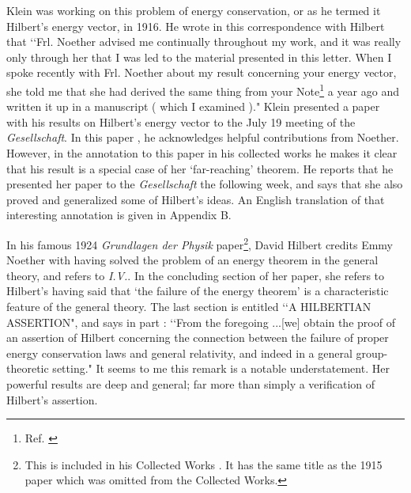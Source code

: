  Klein was working on this problem of energy conservation, or as he
termed it Hilbert's energy vector, in 1916.   He wrote in this correspondence 
with Hilbert that
\lq\lq Frl.  Noether advised me continually throughout my work, and it was really only
through her that I was led to the material presented in this letter.  When I spoke recently
with Frl.  Noether about my result concerning your energy vector, she told me that she had
derived the same thing from your Note\footnote{ Ref.  \cite{hilbert}} a year ago and written
it up in a manuscript ( which I examined )."  Klein presented a paper 
with his results 
 on Hilbert's energy
vector to the July 19 meeting of the {\it{Gesellschaft}}.   In this paper
\cite{kleinpap}, he
acknowledges helpful contributions from Noether. However, in the annotation
to this paper in his
collected works he makes it clear that his result is a special case of her
`far-reaching' theorem.  He reports that he presented her paper to the {\it{Gesellschaft}}
the following week, and  says that she also proved and generalized some of Hilbert's
ideas.  An English translation of that interesting annotation is given in Appendix B.


In his famous
1924 {\it{Grundlagen der Physik}} paper\footnote{ This is included in his Collected Works
\cite{hilbert1}.   It has the same title as the 1915 paper which was omitted from the
 Collected Works.}, David Hilbert credits  Emmy  Noether  with having
solved the problem of an energy theorem in the general  theory, and refers to 
 {\it{I.V.}}. In the concluding section of her paper, she refers to Hilbert's having said that `the failure of
the energy theorem' is a characteristic feature of the general theory. 
 The last section is entitled
 \lq\lq A HILBERTIAN ASSERTION", and says in part  \cite{basil}:  \lq\lq From the foregoing
...[we] obtain the proof of an assertion of Hilbert concerning the connection between the
failure of proper energy conservation laws and general relativity, and indeed in a general
group-theoretic setting."  It seems to me this remark is a notable understatement.  Her powerful results are
 deep and  general; far more  than simply a  verification of Hilbert's assertion.

